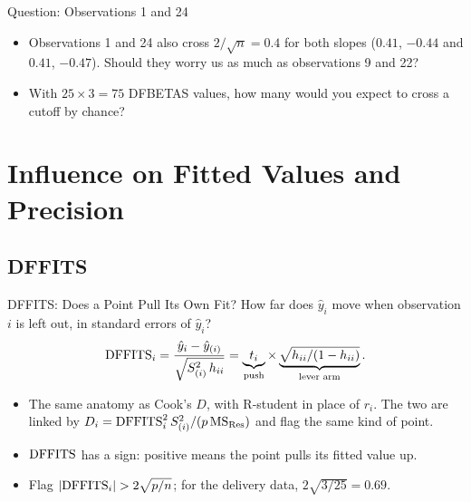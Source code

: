 \begin{frame}{Question: Observations 1 and 24}
    \begin{itemize}
        \item Observations 1 and 24 also cross $2/\sqrt n=0.4$ for both slopes ($0.41$, $-0.44$ and $0.41$, $-0.47$). Should they worry us as much as observations 9 and 22?
        \item With $25\times3=75$ DFBETAS values, how many would you expect to cross a cutoff by chance?
    \end{itemize}
\end{frame}


\section{Influence on Fitted Values and Precision}


\subsection{DFFITS}


\begin{frame}{DFFITS: Does a Point Pull Its Own Fit?}
    How far does $\hat y_i$ move when observation $i$ is left out, in standard errors of $\hat y_i$?
    \[
    \mathrm{DFFITS}_i=\frac{\hat y_i-\hat y_{(i)}}{\sqrt{S_{(i)}^2\,h_{ii}}}
    =\underbrace{t_i}_{\text{push}}\times\underbrace{\sqrt{h_{ii}/(1-h_{ii})}}_{\text{lever arm}} .
    \]
    \begin{itemize}
        \item The same anatomy as Cook's $D$, with R-student in place of $r_i$. The two are linked by $D_i=\mathrm{DFFITS}_i^2\,S_{(i)}^2/(p\,\mathrm{MS}_{\mathrm{Res}})$ and flag the same kind of point.
        \item $\mathrm{DFFITS}$ has a sign: positive means the point pulls its fitted value up.
        \item Flag $|\DFFITS_i|>2\sqrt{p/n}$; for the delivery data, $2\sqrt{3/25}=0.69$.
    \end{itemize}
\end{frame}


